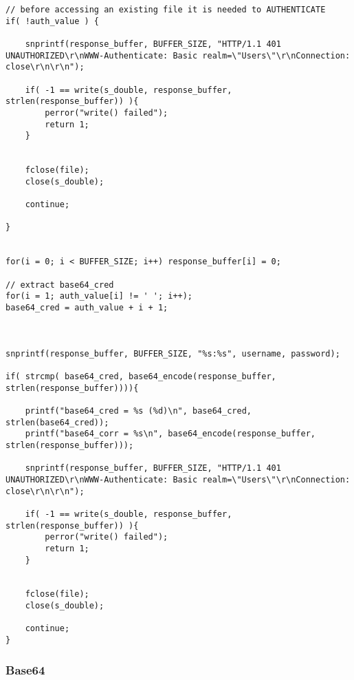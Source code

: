 \begin{lstlisting}
// before accessing an existing file it is needed to AUTHENTICATE
if( !auth_value ) {
    
    snprintf(response_buffer, BUFFER_SIZE, "HTTP/1.1 401 UNAUTHORIZED\r\nWWW-Authenticate: Basic realm=\"Users\"\r\nConnection: close\r\n\r\n");

    if( -1 == write(s_double, response_buffer, strlen(response_buffer)) ){
        perror("write() failed");
        return 1;
    }


    fclose(file);
    close(s_double);

    continue;

}


for(i = 0; i < BUFFER_SIZE; i++) response_buffer[i] = 0;

// extract base64_cred
for(i = 1; auth_value[i] != ' '; i++);
base64_cred = auth_value + i + 1;



snprintf(response_buffer, BUFFER_SIZE, "%s:%s", username, password);

if( strcmp( base64_cred, base64_encode(response_buffer, strlen(response_buffer)))){

    printf("base64_cred = %s (%d)\n", base64_cred, strlen(base64_cred));
    printf("base64_corr = %s\n", base64_encode(response_buffer, strlen(response_buffer)));

    snprintf(response_buffer, BUFFER_SIZE, "HTTP/1.1 401 UNAUTHORIZED\r\nWWW-Authenticate: Basic realm=\"Users\"\r\nConnection: close\r\n\r\n");

    if( -1 == write(s_double, response_buffer, strlen(response_buffer)) ){
        perror("write() failed");
        return 1;
    }
    
    
    fclose(file);
    close(s_double);

    continue;
}
\end{lstlisting}

\subsubsection{Base64}

